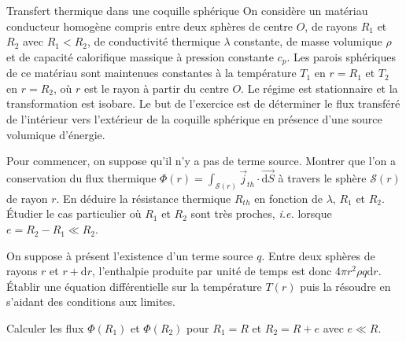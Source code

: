 
\begin{exo}[PSI][1]{Transfert thermique dans une coquille sphérique}
On considère un matériau conducteur homogène compris entre deux sphères de centre $O$, de rayons $R_1$ et $R_2$ avec $R_1 < R_2$, de conductivité thermique $\lambda$ constante, de masse volumique $\rho$ et de capacité calorifique massique à pression constante $c_p$. Les parois sphériques de ce matériau sont maintenues constantes à la température $T_1$ en $r = R_1$ et $T_2$ en $r = R_2$, où $r$ est le rayon à partir du centre $O$. Le régime est stationnaire et la transformation est isobare. Le but de l'exercice est de déterminer le flux transféré de l'intérieur vers l'extérieur de la coquille sphérique en présence d'une source volumique d'énergie.
\begin{quest}
	\item Pour commencer, on suppose qu'il n'y a pas de terme source. Montrer que l'on a conservation du flux thermique $\Phi(r) = \int_{\mathcal{S}(r)} \vec{j}_{th} \cdot \vec{\mathrm{d}S}$ à travers le sphère $\mathcal{S}(r)$ de rayon $r$. En déduire la résistance thermique $R_{th}$ en fonction de $\lambda$, $R_1$ et $R_2$. Étudier le cas particulier où
$R_1$ et $R_2$ sont très proches, \emph{i.e.} lorsque $e=R_2-R_1 \ll R_2$.
	\item On suppose à présent l'existence d'un terme source $q$. Entre deux sphères de rayons $r$ et $r+\mathrm{d}r$, l'enthalpie produite par unité de temps est donc $4 \pi r^2 \rho q \mathrm{d}r$. Établir une équation différentielle sur la température $T(r)$ puis la résoudre en s'aidant des conditions aux limites.
	\item Calculer les flux $\Phi(R_1)$ et $\Phi(R_2)$ pour $R_1 = R$ et $R_2 = R + e$ avec $e \ll R$.
\end{quest}
\end{exo}


